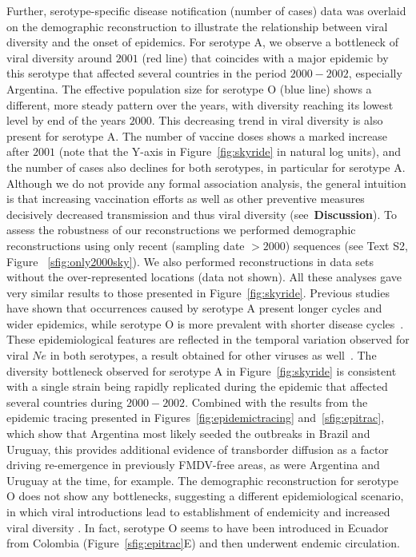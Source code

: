 \documentclass[10pt]{article}
\begin{document}
Further, serotype-specific disease notification (number of cases) data was overlaid on the demographic reconstruction to illustrate the relationship between viral diversity and the onset of epidemics. 
For serotype A, we observe a bottleneck of viral diversity around $2001$ (red line) that coincides with a major epidemic by this serotype that affected several countries in the period $2000-2002$, especially Argentina.
The effective population size for serotype O (blue line) shows a different, more steady pattern over the years, with diversity reaching its lowest level by end of the years $2000$.
This decreasing trend in viral diversity is also present for serotype A.
The number of vaccine doses shows a marked increase after $2001$ (note that the Y-axis in Figure~\ref{fig:skyride} in natural log units), and the number of cases also declines for both serotypes, in particular for serotype A.
Although we do not provide any formal association analysis, the general intuition is that increasing vaccination efforts as well as other preventive measures decisively decreased transmission and thus viral diversity (see~\textbf{Discussion}).
To assess the robustness of our reconstructions we performed demographic reconstructions using only recent (sampling date $>2000$) sequences (see Text S2, Figure ~\ref{sfig:only2000sky}).
We also performed reconstructions in data sets without the over-represented locations (data not shown).
All these analyses gave very similar results to those presented in Figure~\ref{fig:skyride}.
Previous studies have shown that occurrences caused by serotype A present longer cycles and wider epidemics, while serotype O is more prevalent with shorter disease cycles~\cite{colombiatime}.
These epidemiological features are reflected in the temporal variation observed for viral $Ne$ in both serotypes, a result obtained for other viruses as well~\cite{Bennett2010,Pybus2003}. 
The diversity bottleneck observed for serotype A in Figure~\ref{fig:skyride} is consistent with a single strain being rapidly replicated during the epidemic that affected several countries during $2000-2002$.
Combined with the results from the epidemic tracing presented in Figures~\ref{fig:epidemictracing} and~\ref{sfig:epitrac}, which show that Argentina most likely seeded the outbreaks in Brazil and Uruguay, this provides additional evidence of transborder diffusion as a factor driving re-emergence in previously FMDV-free areas, as were Argentina and Uruguay at the time, for example.
The demographic reconstruction for serotype O does not show any bottlenecks, suggesting a different epidemiological scenario, in which viral introductions lead to establishment of endemicity and increased viral diversity .
In fact, serotype O seems to have been introduced in Ecuador from Colombia (Figure~\ref{sfig:epitrac}E) and then underwent endemic circulation.
\end{document}
